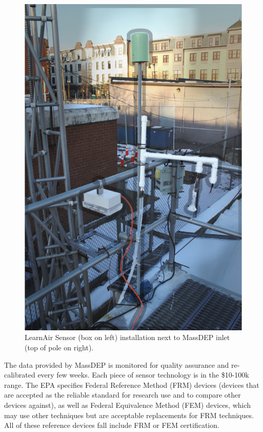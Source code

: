 \begin{figure}[htb]
 	\includegraphics[width=\textwidth]{visuals/epa_zoom}               
 	 \caption{LearnAir Sensor (box on left) installation next to MassDEP inlet (top of pole on right).}
  	\label{fig:epa_zoom}
\end{figure}

The data provided by MassDEP is monitored for quality assurance and re-calibrated every few weeks.  Each piece of sensor technology is in the \$10-100k range.  The EPA specifies Federal Reference Method (FRM) devices (devices that are accepted as the reliable standard for research use and to compare other devices against), as well as Federal Equivalence Method (FEM) devices, which may use other techniques but are acceptable replacements for FRM techniques.  All of these reference devices fall include FRM or FEM certification.

